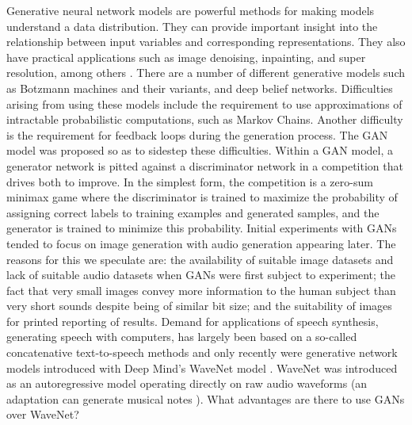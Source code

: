 \documentclass[a4paper, dvipsnames, titlepage]{article}
\begin{document}
Generative neural network models are powerful methods for making models understand a data distribution.
They can provide important insight into the relationship between input variables and corresponding representations.
They also have practical applications such as image denoising, inpainting, and super resolution, among others \cite{openai_blog_2017}.
\newline
\newline
There are a number of different generative models such as Botzmann machines and their variants, and deep belief networks.
Difficulties arising from using these models include the requirement to use approximations of intractable probabilistic computations, such as Markov Chains.
Another difficulty is the requirement for feedback loops during the generation process.
The GAN model was proposed so as to sidestep these difficulties.
\newline
\newline
Within a GAN model, a generator network is pitted against a discriminator network in a competition that drives both to improve.
In the simplest form, the competition is a zero-sum minimax game where the discriminator is trained to maximize the probability of assigning correct labels to training examples and generated samples, and the generator is trained to minimize this probability.
\newline
\newline
Initial experiments with GANs tended to focus on image generation with audio generation appearing later.
The reasons for this we speculate are: the availability of suitable image datasets and lack of suitable audio datasets when GANs were first subject to experiment; the fact that very small images convey more information to the human subject than very short sounds despite being of similar bit size; and the suitability of images for printed reporting of results.
\newline
\newline
Demand for applications of speech synthesis, generating speech with computers, has largely been based on a so-called concatenative text-to-speech methods and only recently were generative network models introduced with Deep Mind's WaveNet model \cite{waveNetUrl}.
WaveNet was introduced as an autoregressive model operating directly on raw audio waveforms \cite{DBLP:journals/corr/OordDZSVGKSK16} (an adaptation can generate musical notes \cite{2017arXiv170401279E}).
\newline
\newline
What advantages are there to use GANs over WaveNet?
\end{document}
